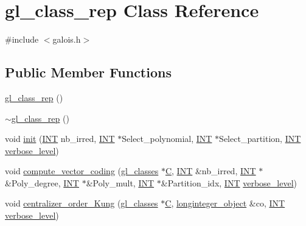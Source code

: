 \hypertarget{classgl__class__rep}{}\section{gl\+\_\+class\+\_\+rep Class Reference}
\label{classgl__class__rep}


{\ttfamily \#include $<$galois.\+h$>$}

\subsection*{Public Member Functions}
\begin{DoxyCompactItemize}
\item 
\mbox{\hyperlink{classgl__class__rep_afe8e1695688f4ab9e37f864e8b4531ce}{gl\+\_\+class\+\_\+rep}} ()
\item 
\mbox{\hyperlink{classgl__class__rep_ad22a227d8a4b23eb42aa563bb65e3f6d}{$\sim$gl\+\_\+class\+\_\+rep}} ()
\item 
void \mbox{\hyperlink{classgl__class__rep_a4702a1e8737629277afbd2f7cb083850}{init}} (\mbox{\hyperlink{galois_8h_a09fddde158a3a20bd2dcadb609de11dc}{I\+NT}} nb\+\_\+irred, \mbox{\hyperlink{galois_8h_a09fddde158a3a20bd2dcadb609de11dc}{I\+NT}} $\ast$Select\+\_\+polynomial, \mbox{\hyperlink{galois_8h_a09fddde158a3a20bd2dcadb609de11dc}{I\+NT}} $\ast$Select\+\_\+partition, \mbox{\hyperlink{galois_8h_a09fddde158a3a20bd2dcadb609de11dc}{I\+NT}} \mbox{\hyperlink{simeon_8_c_a818073fbcc2f439e7c56952f67386122}{verbose\+\_\+level}})
\item 
void \mbox{\hyperlink{classgl__class__rep_ae202478be1618fdcc5e047b40a614973}{compute\+\_\+vector\+\_\+coding}} (\mbox{\hyperlink{classgl__classes}{gl\+\_\+classes}} $\ast$\mbox{\hyperlink{costas_8_c_aacbbb35f36efadbb40803bfb5480b737}{C}}, \mbox{\hyperlink{galois_8h_a09fddde158a3a20bd2dcadb609de11dc}{I\+NT}} \&nb\+\_\+irred, \mbox{\hyperlink{galois_8h_a09fddde158a3a20bd2dcadb609de11dc}{I\+NT}} $\ast$\&Poly\+\_\+degree, \mbox{\hyperlink{galois_8h_a09fddde158a3a20bd2dcadb609de11dc}{I\+NT}} $\ast$\&Poly\+\_\+mult, \mbox{\hyperlink{galois_8h_a09fddde158a3a20bd2dcadb609de11dc}{I\+NT}} $\ast$\&Partition\+\_\+idx, \mbox{\hyperlink{galois_8h_a09fddde158a3a20bd2dcadb609de11dc}{I\+NT}} \mbox{\hyperlink{simeon_8_c_a818073fbcc2f439e7c56952f67386122}{verbose\+\_\+level}})
\item 
void \mbox{\hyperlink{classgl__class__rep_abdc7ece2f243cf3d48d8e590f414e746}{centralizer\+\_\+order\+\_\+\+Kung}} (\mbox{\hyperlink{classgl__classes}{gl\+\_\+classes}} $\ast$\mbox{\hyperlink{costas_8_c_aacbbb35f36efadbb40803bfb5480b737}{C}}, \mbox{\hyperlink{classlonginteger__object}{longinteger\+\_\+object}} \&co, \mbox{\hyperlink{galois_8h_a09fddde158a3a20bd2dcadb609de11dc}{I\+NT}} \mbox{\hyperlink{simeon_8_c_a818073fbcc2f439e7c56952f67386122}{verbose\+\_\+level}})
\end{DoxyCompactItemize}
